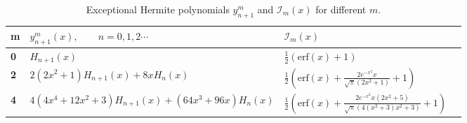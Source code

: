 \documentclass[11pt]{article}
\begin{document}
\begin{table}[htp]
\centering
\setlength{\tabcolsep}{2em}
\begin{tabularx}{\columnwidth}{@{}>{\bfseries}l X X l @{}}
\toprule
m & \(y^m_{n+1}(x),\qquad n=0,1,2\cdots \)&\( \mathcal{I}_m(x) \)\\
\toprule
0& \( H_{n+1}(x) \) &\(\frac{1}{2} (\text{erf}(x)+1)  \)\\
2& \( 2 \left(2 x^2+1\right) H_{n+1}(x)+8 x H_n(x) \) &\( \frac{1}{2} \left(\text{erf}(x)+\frac{2 e^{-x^2} x}{\sqrt{\pi } \left(2 x^2+1\right)}+1\right) \)\\
4& \( 4 \left( 4x^4+12x^2+3\right) H_{n+1}(x)+ \left(64 x^3+96x\right) H_n(x)\) &\(\frac{1}{2} \left(\text{erf}(x)+\frac{2 e^{-x^2} x \left(2 x^2+5\right)}{\sqrt{\pi } \left(4 \left(x^2+3\right) x^2+3\right)}+1\right)  \)\\
\bottomrule
\end{tabularx}
\caption{ Exceptional Hermite polynomials \( y^m_{n+1} \) and  \(\mathcal{I}_m(x)\) for different \( m \).}
\label{tab-yi}
\end{table}

\end{document}
